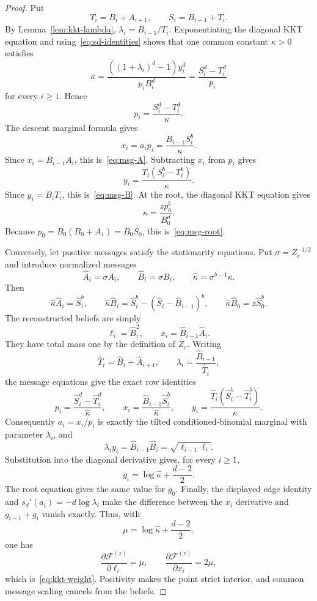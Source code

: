 \documentclass[11pt]{amsart}
\theoremstyle{definition}
\newcommand{\Fcal}{\mathcal F}
\begin{document}
\begin{proof}
Put
\[
 T_i=B_i+A_{i+1},
 \qquad
 S_i=B_{i-1}+T_i.
\]
By Lemma~\ref{lem:kkt-lambda}, $\lambda_i=B_{i-1}/T_i$.  Exponentiating the diagonal KKT equation and using~\eqref{eq:sd-identities} shows that one common constant $\kappa>0$ satisfies
\[
 \kappa
 =\frac{((1+\lambda_i)^d-1)y_i^d}{p_iB_i^d}
 =\frac{S_i^d-T_i^d}{p_i}
\]
for every $i\ge1$.  Hence
\[
 p_i=\frac{S_i^d-T_i^d}{\kappa}.
\]
The descent marginal formula gives
\[
 x_i=a_ip_i
 =\frac{B_{i-1}S_i^b}{\kappa}.
\]
Since $x_i=B_{i-1}A_i$, this is~\eqref{eq:msg-A}.  Subtracting $x_i$ from $p_i$ gives
\[
 y_i=\frac{T_i(S_i^b-T_i^b)}{\kappa}.
\]
Since $y_i=B_iT_i$, this is~\eqref{eq:msg-B}.  At the root, the diagonal KKT equation gives
\[
 \kappa=\frac{zp_0^b}{B_0^d}.
\]
Because $p_0=B_0(B_0+A_1)=B_0S_0$, this is~\eqref{eq:msg-root}.

Conversely, let positive messages satisfy the stationarity equations.  Put $\sigma=Z_e^{-1/2}$ and introduce normalized messages
\[
 \widehat A_i=\sigma A_i,
 \qquad
 \widehat B_i=\sigma B_i,
 \qquad
 \widehat\kappa=\sigma^{b-1}\kappa.
\]
Then
\[
 \widehat\kappa\widehat A_i=\widehat S_i^b,
 \qquad
 \widehat\kappa\widehat B_i
 =\widehat S_i^b-(\widehat S_i-\widehat B_{i-1})^b,
 \qquad
 \widehat\kappa\widehat B_0=z\widehat S_0^b.
\]
The reconstructed beliefs are simply
\[
 \ell_i=\widehat B_i^2,
 \qquad
 x_i=\widehat B_{i-1}\widehat A_i.
\]
They have total mass one by the definition of $Z_e$.  Writing
\[
 \widehat T_i=\widehat B_i+\widehat A_{i+1},
 \qquad
 \lambda_i=\frac{\widehat B_{i-1}}{\widehat T_i},
\]
the message equations give the exact row identities
\[
 p_i=\frac{\widehat S_i^d-\widehat T_i^d}{\widehat\kappa},
 \qquad
 x_i=\frac{\widehat B_{i-1}\widehat S_i^b}{\widehat\kappa},
 \qquad
 y_i=\frac{\widehat T_i(\widehat S_i^b-\widehat T_i^b)}{\widehat\kappa}.
\]
Consequently $a_i=x_i/p_i$ is exactly the tilted conditioned-binomial marginal with parameter $\lambda_i$, and
\[
 \lambda_i y_i
 =\widehat B_{i-1}\widehat B_i
 =\sqrt{\ell_{i-1}\ell_i}.
\]
Substitution into the diagonal derivative gives, for every $i\ge1$,
\[
 g_i=\log\widehat\kappa+\frac{d-2}{2}.
\]
The root equation gives the same value for $g_0$.  Finally, the displayed edge identity and $s_d'(a_i)=-d\log\lambda_i$ make the difference between the $x_i$ derivative and $g_{i-1}+g_i$ vanish exactly.  Thus, with
\[
 \mu=\log\widehat\kappa+\frac{d-2}{2},
\]
one has
\[
 \frac{\partial\Fcal^{(z)}}{\partial\ell_i}=\mu,
 \qquad
 \frac{\partial\Fcal^{(z)}}{\partial x_i}=2\mu,
\]
which is~\eqref{eq:kkt-weight}.  Positivity makes the point strict interior, and common message scaling cancels from the beliefs.
\end{proof}
\end{document}
